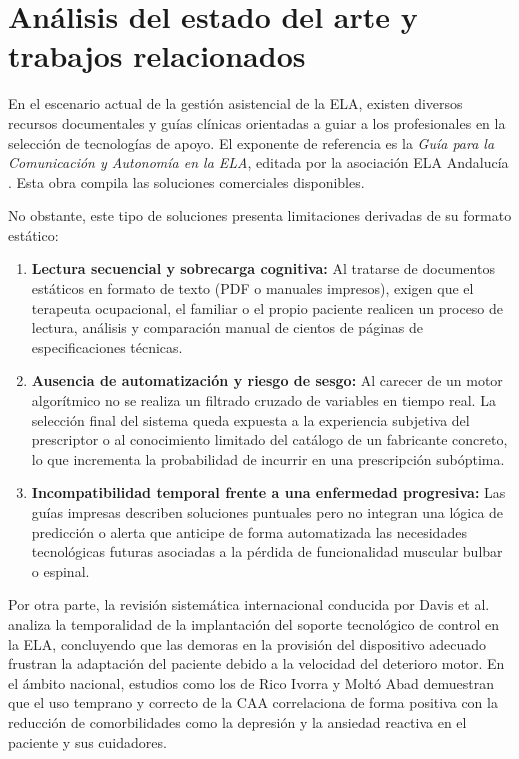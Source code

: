 \section{Análisis del estado del arte y trabajos relacionados}
En el escenario actual de la gestión asistencial de la ELA, existen diversos recursos documentales y guías clínicas orientadas a guiar a los profesionales en la selección de tecnologías de apoyo. El exponente de referencia es la \textit{Guía para la Comunicación y Autonomía en la ELA}, editada por la asociación ELA Andalucía \cite{elaandalucia:guia}. Esta obra compila las soluciones comerciales disponibles.

No obstante, este tipo de soluciones presenta limitaciones derivadas de su formato estático:
\begin{enumerate}
    	\item \textbf{Lectura secuencial y sobrecarga cognitiva:} Al tratarse de documentos estáticos en formato de texto (PDF o manuales impresos), exigen que el terapeuta ocupacional, el familiar o el propio paciente realicen un proceso de lectura, análisis y comparación manual de 			cientos de páginas de especificaciones técnicas.
    	\item \textbf{Ausencia de automatización y riesgo de sesgo:} Al carecer de un motor algorítmico no se realiza un filtrado cruzado de variables en tiempo real. La selección final del sistema queda expuesta a la experiencia subjetiva del prescriptor o al conocimiento limitado del 			catálogo de un fabricante concreto, lo que incrementa la probabilidad de incurrir en una prescripción subóptima.
    	\item \textbf{Incompatibilidad temporal frente a una enfermedad progresiva:} Las guías impresas describen soluciones puntuales pero no integran una lógica de predicción o alerta que anticipe de forma automatizada las necesidades tecnológicas futuras asociadas a la pérdida de 		funcionalidad muscular bulbar o espinal.
\end{enumerate}

Por otra parte, la revisión sistemática internacional conducida por Davis et al. \cite{taylor2026timing} analiza la temporalidad de la implantación del soporte tecnológico de control en la ELA, concluyendo que las demoras en la provisión del dispositivo adecuado frustran la adaptación del paciente debido a la velocidad del deterioro motor. En el ámbito nacional, estudios como los de Rico Ivorra y Moltó Abad \cite{rico2021comunicacion} demuestran que el uso temprano y correcto de la CAA correlaciona de forma positiva con la reducción de comorbilidades como la depresión y la ansiedad reactiva en el paciente y sus cuidadores.

